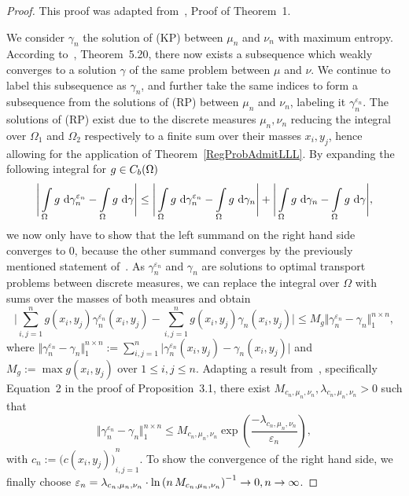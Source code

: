 \begin{proof}
	This proof was adapted from~\cite{Seg2018}, Proof of Theorem~1.

	We consider $\gamma_n$ the solution of (KP) between $\mu_n$ and $\nu_n$ with maximum entropy. According to~\cite{Vill2009}, Theorem~5.20, there now exists a subsequence which weakly converges to a solution $\gamma$ of the same problem between $\mu$ and $\nu$. We continue to label this subsequence as $\gamma_n$, and further take the same indices to form a subsequence from the solutions of (RP) between $\mu_n$ and $\nu_n$, labeling it $\gamma_n^{\varepsilon_n}$. The solutions of (RP) exist due to the discrete measures $\mu_n, \nu_n$ reducing the integral over $\Omega_1$ and $\Omega_2$ respectively to a finite sum over their masses $x_i, y_j$, hence allowing for the application of Theorem~\ref{RegProbAdmitLLL}. By expanding the following integral for $g \in \CF[b]{\Omega}$
	\[ \Bigg\lvert \int\limits_{\Omega} g~\D[\gamma_n^{\varepsilon_n}] - \int\limits_{\Omega} g~\D[\gamma] \Bigg\rvert \le \Bigg\lvert \int\limits_{\Omega} g~\D[\gamma_n^{\varepsilon_n}] - \int\limits_{\Omega} g~\D[\gamma_n] \Bigg\rvert + \Bigg\lvert \int\limits_{\Omega} g~\D[\gamma_n] - \int\limits_{\Omega} g~\D[\gamma] \Bigg\rvert, \]
	we now only have to show that the left summand on the right hand side converges to $0$, because the other summand converges by the previously mentioned statement of~\cite{Vill2009}. As $\gamma_n^{\varepsilon_n}$ and $\gamma_n$ are solutions to optimal transport problems between discrete measures, we can replace the integral over $\Omega$ with sums over the masses of both measures and obtain
	\[ \Bigg\lvert \sum\limits_{i, j = 1}^n g(x_i, y_j) \gamma_n^{\varepsilon_n}(x_i, y_j) - \sum\limits_{i, j = 1}^n g(x_i, y_j) \gamma_n(x_i, y_j) \Bigg\rvert \le M_g \Vert \gamma_n^{\varepsilon_n} - \gamma_n \Vert_{1}^{n \times n}, \]
	where $\Vert \gamma_n^{\varepsilon_n} - \gamma_n \Vert_{1}^{n \times n} := \sum\limits_{i, j = 1}^n \big\lvert \gamma_n^{\varepsilon_n}(x_i, y_j) - \gamma_n(x_i, y_j) \big\rvert$ and $M_g := \max g(x_i, y_j)$ over $1 \le i, j \le n$. Adapting a result from~\cite{Comi1994}, specifically Equation~2 in the proof of Proposition~3.1, there exist $M_{c_n, \mu_n, \nu_n}, \lambda_{c_n, \mu_n, \nu_n} > 0$ such that
	\[ \Vert \gamma_n^{\varepsilon_n} - \gamma_n \Vert_1^{n \times n} \le M_{c_n, \mu_n, \nu_n} \exp\left( \frac{-\lambda_{c_n, \mu_n, \nu_n}}{\varepsilon_n} \right), \]
	with $c_n := {\big( c(x_i, y_j) \big)}_{i, j = 1}^n$. To show the convergence of the right hand side, we finally choose $\varepsilon_n = \lambda_{c_n, \mu_n, \nu_n} \cdot {\ln\left( n\,M_{c_n, \mu_n, \nu_n} \right)}^{-1} \rightarrow 0, \Ninf$.
\end{proof}

